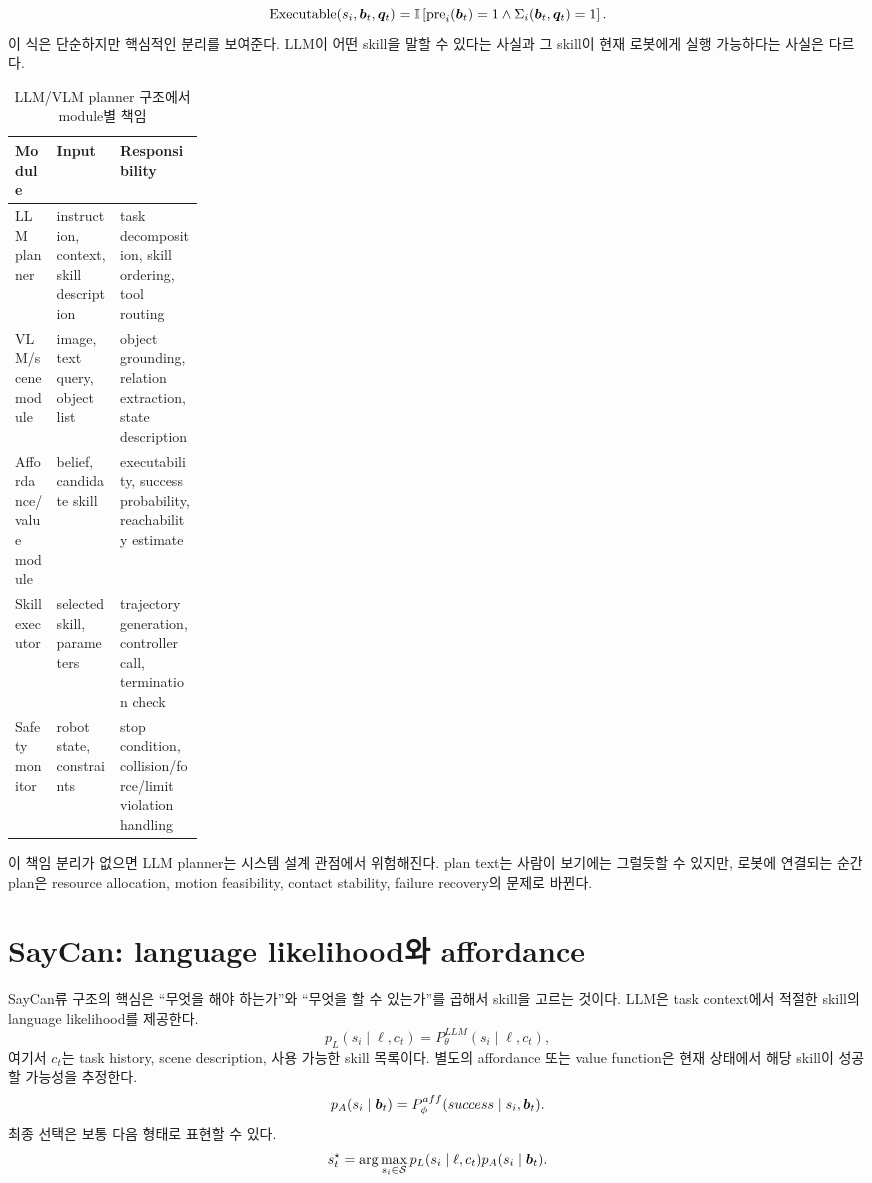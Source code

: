 \begin{equation}
  \mathrm{Executable}(s_i,\bm{b}_t,\bm{q}_t)
  =
  \mathbb{I}
  \left[
    \mathrm{pre}_i(\bm{b}_t)=1
    \land
    \Sigma_i(\bm{b}_t,\bm{q}_t)=1
  \right].
  \label{eq:skill-executable}
\end{equation}
이 식은 단순하지만 핵심적인 분리를 보여준다. LLM이 어떤 skill을 말할 수 있다는 사실과 그 skill이 현재 로봇에게 실행 가능하다는 사실은 다르다.

\begin{table}[h]
  \centering
  \caption{LLM/VLM planner 구조에서 module별 책임}
  \begin{tabularx}{\linewidth}{p{0.22\linewidth}X X}
    \toprule
    Module & Input & Responsibility \\
    \midrule
    LLM planner & instruction, context, skill description & task decomposition, skill ordering, tool routing \\
    VLM/scene module & image, text query, object list & object grounding, relation extraction, state description \\
    Affordance/value module & belief, candidate skill & executability, success probability, reachability estimate \\
    Skill executor & selected skill, parameters & trajectory generation, controller call, termination check \\
    Safety monitor & robot state, constraints & stop condition, collision/force/limit violation handling \\
    \bottomrule
  \end{tabularx}
  \label{tab:llm-planner-modules}
\end{table}

이 책임 분리가 없으면 LLM planner는 시스템 설계 관점에서 위험해진다. plan text는 사람이 보기에는 그럴듯할 수 있지만, 로봇에 연결되는 순간 plan은 resource allocation, motion feasibility, contact stability, failure recovery의 문제로 바뀐다.

\section{SayCan: language likelihood와 affordance}

SayCan류 구조의 핵심은 ``무엇을 해야 하는가''와 ``무엇을 할 수 있는가''를 곱해서 skill을 고르는 것이다. LLM은 task context에서 적절한 skill의 language likelihood를 제공한다.
\begin{equation}
  p_L(s_i \mid \ell, c_t)
  =
  P_{\theta}^{LLM}(s_i \mid \ell, c_t),
  \label{eq:saycan-language}
\end{equation}
여기서 $c_t$는 task history, scene description, 사용 가능한 skill 목록이다. 별도의 affordance 또는 value function은 현재 상태에서 해당 skill이 성공할 가능성을 추정한다.
\begin{equation}
  p_A(s_i \mid \bm{b}_t)
  =
  P_{\phi}^{aff}(success \mid s_i,\bm{b}_t).
  \label{eq:saycan-affordance}
\end{equation}
최종 선택은 보통 다음 형태로 표현할 수 있다.
\begin{equation}
  s_t^{\star}
  =
  \arg\max_{s_i \in \mathcal{S}}
  p_L(s_i \mid \ell,c_t)
  p_A(s_i \mid \bm{b}_t).
  \label{eq:saycan-score}
\end{equation}

